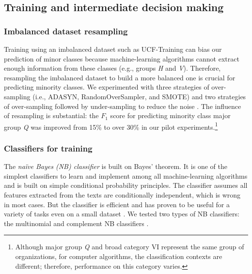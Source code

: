\documentclass[11pt]{article}
\begin{document}
\subsection{Training and intermediate decision making}

\subsubsection{Imbalanced dataset resampling}

Training using an imbalanced dataset such as UCF-Training can bias our prediction of minor classes because machine-learning algorithms cannot extract enough information from these classes (e.g., groups \textit{H} and \textit{V}). Therefore, resampling the imbalanced dataset to build a more balanced one is crucial for predicting minority classes. We experimented with three strategies of over-sampling (i.e., ADASYN, RandomOverSampler, and SMOTE) and two strategies of over-sampling followed by under-sampling to reduce the noise \parencite[i.e., SMOTEENN and SMOTETomek;][]{LemaitreImbalancedlearnPythonToolbox2017}. The influence of resampling is substantial: the $F_1$ score for predicting minority class major group \textit{Q} was improved from 15\% to over 30\% in our pilot experiments.\footnote{Although major group \textit{Q} and broad category {VI} represent the same group of organizations, for computer algorithms, the classification contexts are different; therefore, performance on this category varies.}

\subsubsection{Classifiers for training}

The \textit{na\"ive Bayes (NB) classifier} is built on Bayes' theorem. It is one of the simplest classifiers to learn and implement among all machine-learning algorithms and is built on simple conditional probability principles. The classifier assumes all features extracted from the texts are conditionally independent, which is wrong in most cases. But the classifier is efficient and has proven to be useful for a variety of tasks even on a small dataset \parencites[][76]{JurafskySpeechLanguageProcessing2017}[][277]{GrimmerTextDataPromise2013}. We tested two types of NB classifiers: the multinomial and complement NB classifiers \parencite{RennieTacklingPoorAssumptions2003}.
\end{document}

